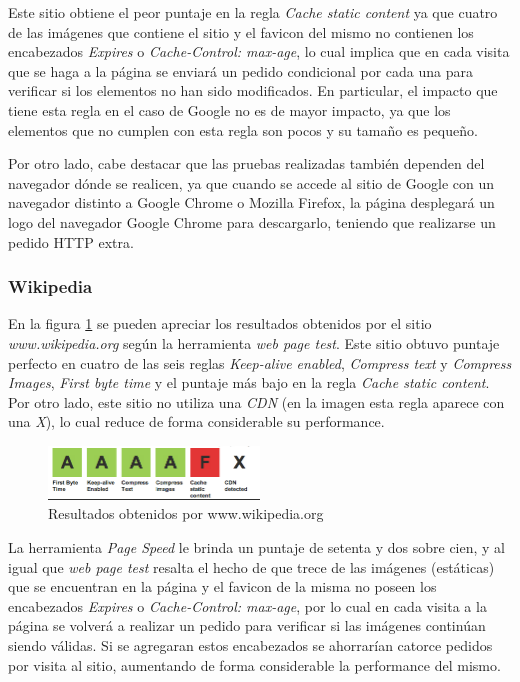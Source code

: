 Este sitio obtiene el peor puntaje en la regla \emph{Cache static content} ya que cuatro de las imágenes que contiene el sitio y el favicon del mismo no contienen los encabezados
\emph{Expires} o \emph{Cache-Control: max-age}, lo cual implica que en cada visita que se haga a la página se enviará un pedido condicional por cada una para verificar si los
elementos no han sido modificados. En particular, el impacto que tiene esta regla en el caso de Google no es de mayor impacto, ya que los elementos que no cumplen con esta regla son pocos
y su tamaño es pequeño.

Por otro lado, cabe destacar que las pruebas realizadas también dependen del navegador dónde se realicen, ya que cuando se accede al sitio de Google con un navegador
distinto a Google Chrome o Mozilla Firefox, la página desplegará un logo del navegador Google Chrome para descargarlo, teniendo que realizarse un pedido HTTP extra.

\subsubsection{Wikipedia}

En la figura \ref{fig.wikipedia_page_results} se pueden apreciar los resultados obtenidos por el sitio \emph{www.wikipedia.org} según la herramienta \emph{web page test}. Este sitio
obtuvo puntaje perfecto en cuatro de las seis reglas \emph{Keep-alive enabled}, \emph{Compress text} y \emph{Compress Images}, \emph{First byte time} y el puntaje
más bajo en la regla \emph{Cache static content}. Por otro lado, este sitio no utiliza una \emph{CDN} (en la imagen esta regla aparece con una \emph{X}), lo cual reduce de
forma considerable su performance.

\begin{figure}[h]
\centering
\includegraphics[width=0.5\textwidth]{figuras/lado_cliente/wikipedia/page_results.png}
  \caption{Resultados obtenidos por www.wikipedia.org}
    \label{fig.wikipedia_page_results}
\end{figure}

La herramienta \emph{Page Speed} le brinda un puntaje de setenta y dos sobre cien, y al igual que \emph{web page test} resalta el hecho de que trece de las imágenes (estáticas) que se encuentran en la página y el favicon de la misma no poseen los encabezados \emph{Expires} o \emph{Cache-Control: max-age}, por lo cual en cada visita a
la página se volverá a realizar un pedido para verificar si las imágenes continúan siendo válidas. Si se agregaran estos encabezados se ahorrarían catorce pedidos por visita al sitio, aumentando de forma considerable la performance del mismo.

